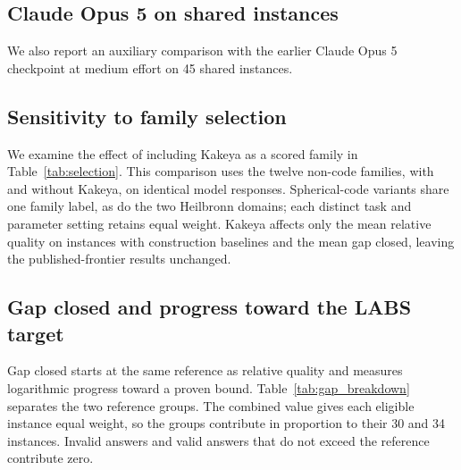 \subsection{Claude Opus 5 on shared instances}
\label{app:opus_subset}
We also report an auxiliary comparison with the earlier Claude Opus 5 checkpoint at medium effort on 45 shared instances.
\begin{center}
\centering\footnotesize

\label{tab:opus_subset}
\end{center}
\subsection{Sensitivity to family selection}
\label{app:selection}
We examine the effect of including Kakeya as a scored family in Table~\ref{tab:selection}. This comparison uses the twelve non-code families, with and without Kakeya, on identical model responses. Spherical-code variants share one family label, as do the two Heilbronn domains; each distinct task and parameter setting retains equal weight. Kakeya affects only the mean relative quality on instances with construction baselines and the mean gap closed, leaving the published-frontier results unchanged.
\begin{center}
\centering\footnotesize
\resizebox{\linewidth}{!}{}
\label{tab:selection}
\end{center}

\appendixpage
\subsection{Gap closed and progress toward the LABS target}
\label{app:gap_breakdown}
Gap closed starts at the same reference as relative quality and measures logarithmic progress toward a proven bound. Table~\ref{tab:gap_breakdown} separates the two reference groups. The combined value gives each eligible instance equal weight, so the groups contribute in proportion to their 30 and 34 instances. Invalid answers and valid answers that do not exceed the reference contribute zero.

